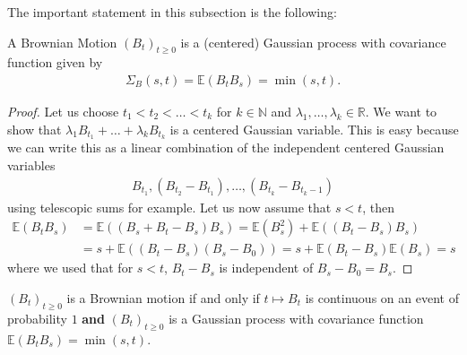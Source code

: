 \documentclass[../mainfile.tex]{subfiles}
\begin{document}
The important statement in this subsection is the following:
\begin{prop} A Brownian Motion $(B_t)_{t \geq 0}$ is a (centered) Gaussian process with covariance function given by 
\begin{align*}
\Sigma_B(s,t)= \mathbb{E}(B_tB_s)= \min(s,t).
\end{align*}
\end{prop}
\newpage
\begin{proof}
Let us choose $t_1 < t_2< \dots < t_k$ for $k \in \mathbb{N}$ and $\lambda_1, \dots , \lambda_k \in \mathbb{R}$. We want to show that $\lambda_1 B_{t_1}+ \dots + \lambda_k B_{t_k}$ is a centered Gaussian variable. This is easy because we can write this as a linear combination of the independent centered Gaussian variables 
\begin{align*}
B_{t_1}, (B_{t_2}-B_{t_1}), \dots , (B_{t_k}-B_{t_k-1})
\end{align*}
using telescopic sums for example. Let us now assume that $s<t$, then 
\begin{align*}
\mathbb{E}(B_tB_s)&= \mathbb{E}((B_s+B_t-B_s)B_s) = \mathbb{E}(B_s^2) + \mathbb{E}((B_t-B_s)B_s) \\ 
&= s + \mathbb{E}((B_t-B_s)(B_s-B_0))= s + \mathbb{E}(B_t-B_s)\mathbb{E}(B_s)= s
\end{align*}
where we used that for $s<t$, $B_t-B_s$ is independent of $B_s-B_0=B_s$.
\end{proof}
\begin{cor}[Characterization] $(B_t)_{t \geq 0}$ is a Brownian motion if and only if $t \mapsto B_t$ is continuous on an event of probability $1$ \textbf{and} $(B_t)_{t \geq 0}$ is a Gaussian process with covariance function $\mathbb{E}(B_tB_s)= \min(s,t)$. 
\end{cor}
\end{document}
